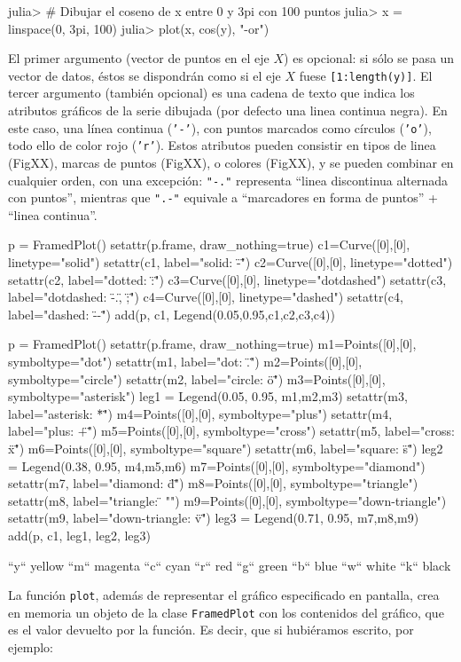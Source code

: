﻿\documentclass{article}
\newcommand{\code}{\texttt}
\begin{document}
julia> # Dibujar el coseno de x entre 0 y 3pi con 100 puntos
julia> x = linspace(0, 3pi, 100)
julia> plot(x, cos(y), "-or")

El primer argumento (vector de puntos en el eje $X$) es opcional: si sólo se pasa un vector de datos, éstos se dispondrán como si el eje $X$ fuese \code{[1:length(y)]}. El tercer argumento (también opcional) es una cadena de texto que indica los atributos gráficos de la serie dibujada (por defecto una linea continua negra). En este caso, una línea continua (\code{'-'}), con puntos marcados como círculos (\code{'o'}), todo ello de color rojo (\code{'r'}). Estos atributos pueden consistir en tipos de linea (FigXX), marcas de puntos (FigXX), o colores (FigXX), y se pueden combinar en cualquier orden, con una excepción: \code{"-."} representa ``linea discontinua alternada con puntos'', mientras que \code{".-"} equivale a ``marcadores en forma de puntos'' + ``linea continua''.


p = FramedPlot()
setattr(p.frame, draw_nothing=true)
c1=Curve([0],[0], linetype="solid")
setattr(c1, label="solid: \"-\"")
c2=Curve([0],[0], linetype="dotted")
setattr(c2, label="dotted: \":\"")
c3=Curve([0],[0], linetype="dotdashed")
setattr(c3, label="dotdashed: \"-.\", \";\"")
c4=Curve([0],[0], linetype="dashed")
setattr(c4, label="dashed: \"--\"")
add(p, c1, Legend(0.05,0.95,{c1,c2,c3,c4}))

p = FramedPlot()
setattr(p.frame, draw_nothing=true)
m1=Points([0],[0], symboltype="dot")
setattr(m1, label="dot: \".\"")
m2=Points([0],[0], symboltype="circle")
setattr(m2, label="circle: \"o\"")
m3=Points([0],[0], symboltype="asterisk")
leg1 = Legend(0.05, 0.95, {m1,m2,m3})
setattr(m3, label="asterisk: \"*\"")
m4=Points([0],[0], symboltype="plus")
setattr(m4, label="plus: \"+\"")
m5=Points([0],[0], symboltype="cross")
setattr(m5, label="cross: \"x\"")
m6=Points([0],[0], symboltype="square")
setattr(m6, label="square: \"s\"")
leg2 = Legend(0.38, 0.95, {m4,m5,m6})
m7=Points([0],[0], symboltype="diamond")
setattr(m7, label="diamond: \"d\"")
m8=Points([0],[0], symboltype="triangle")
setattr(m8, label="triangle: \"^^\"")
m9=Points([0],[0], symboltype="down-triangle")
setattr(m9, label="down-triangle: \"v\"")
leg3 = Legend(0.71, 0.95, {m7,m8,m9})
add(p, c1, leg1, leg2, leg3)

``y``     yellow
``m``     magenta
``c``     cyan
``r``     red
``g``     green
``b``     blue
``w``     white
``k``     black

La función \code{plot}, además de representar el gráfico especificado en pantalla, crea en memoria un objeto de la clase \code{FramedPlot} con los contenidos del gráfico, que es el valor devuelto por la función. Es decir, que si hubiéramos escrito, por ejemplo:
\end{document}
